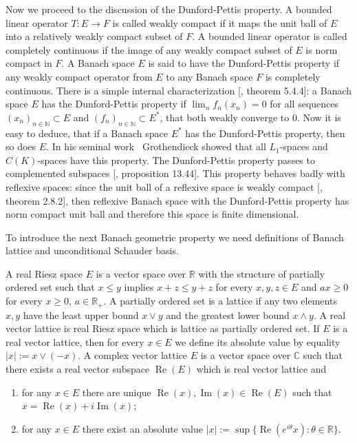 Now we proceed to the discussion of the Dunford-Pettis property. A bounded
linear operator $T:E\to F$ is called weakly compact if it maps the unit ball of
$E$ into a relatively weakly compact subset of $F$. A bounded linear operator is
called completely continuous if the image of any weakly compact subset of $E$ is
norm compact in $F$. A Banach space $E$ is said to have the Dunford-Pettis
property if any weakly compact operator from $E$ to any Banach space $F$ is
completely continuous. There is a simple internal characterization
[\cite{KalAlbTopicsBanSpTh}, theorem 5.4.4]: a Banach space $E$ has the
Dunford-Pettis property if $\lim_n f_n(x_n)=0$ for all sequences
${(x_n)}_{n\in\mathbb{N}}\subset E$ and ${(f_n)}_{n\in\mathbb{N}}\subset E^*$, 
that both weakly converge to $0$. Now it is easy to deduce, 
that if a Banach space $E^*$ has the Dunford-Pettis property, then so does $E$.
In his seminal work~\cite{GrothApllFaiblCompSpCK} Grothendieck showed that all
$L_1$-spaces and $C(K)$-spaces have this property. The Dunford-Pettis property
passes to complemented subspaces [\cite{FabHabBanSpTh}, proposition 13.44]. This
property behaves badly with reflexive spaces: since the unit ball of a reflexive
space is weakly compact [\cite{MeggIntroBanSpTh}, theorem 2.8.2], then reflexive
Banach space with the Dunford-Pettis property has norm compact unit ball and
therefore this space is finite dimensional. 

To introduce the next Banach geometric property we need definitions of Banach
lattice and unconditional Schauder basis. 

A real Riesz space $E$ is a vector space over $\mathbb{R}$ with the structure of
partially ordered set such that $x\leq y$ implies $x+z\leq y+z$ for every
$x,y,z\in E$ and $ax\geq 0$ for every $x\geq 0$, $a\in\mathbb{R}_+$. A partially
ordered set is a lattice if any two elements ${x,y}$ have the least upper bound
$x\vee y$ and the greatest lower bound $x\wedge y$. A real vector lattice is
real Riesz space which is lattice as partially ordered set. If $E$ is a real
vector lattice, then for every $x\in E$ we define its absolute value by equality
$|x|:=x\vee(-x)$. A complex vector lattice $E$ is a vector space over
$\mathbb{C}$ such that there exists a real vector subspace
$\operatorname{Re}(E)$ which is real vector lattice and
\begin{enumerate}[label = (\roman*)]
  \item for any $x\in E$ there are unique
  $\operatorname{Re}(x),\operatorname{Im}(x)\in \operatorname{Re}(E)$ such that
  $x=\operatorname{Re}(x)+i\operatorname{Im}(x)$;

  \item for any $x\in E$ there exist an absolute value $|x|:=\sup
  \{\operatorname{Re}(e^{i\theta}x):\theta\in\mathbb{R} \}$.
\end{enumerate}

